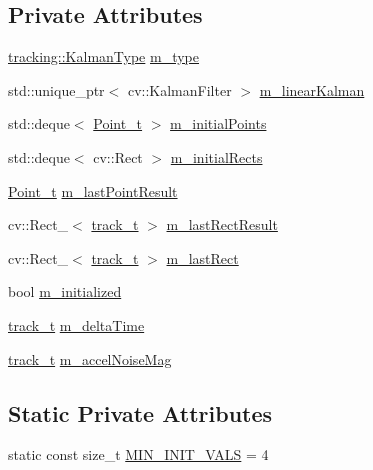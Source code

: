 \subsection*{Private Attributes}
\begin{DoxyCompactItemize}
\item 
\mbox{\hyperlink{namespacetracking_a83f2c4d58ea2737f7d6296dce3eb722a}{tracking\+::\+Kalman\+Type}} \mbox{\hyperlink{class_t_kalman_filter_a00cabc6683f6cc848559515df46d7101}{m\+\_\+type}}
\item 
std\+::unique\+\_\+ptr$<$ cv\+::\+Kalman\+Filter $>$ \mbox{\hyperlink{class_t_kalman_filter_aec607aacb57ef1f78e514c6b3ef18435}{m\+\_\+linear\+Kalman}}
\item 
std\+::deque$<$ \mbox{\hyperlink{defines_8h_a8c42696da8f098b91374a8e8bb84b430}{Point\+\_\+t}} $>$ \mbox{\hyperlink{class_t_kalman_filter_a5c4fc5a43ce0798dbe80f76f8aae2fc9}{m\+\_\+initial\+Points}}
\item 
std\+::deque$<$ cv\+::\+Rect $>$ \mbox{\hyperlink{class_t_kalman_filter_a76f15da72d3613b8ba41a9eb38faaeac}{m\+\_\+initial\+Rects}}
\item 
\mbox{\hyperlink{defines_8h_a8c42696da8f098b91374a8e8bb84b430}{Point\+\_\+t}} \mbox{\hyperlink{class_t_kalman_filter_a91efb6a00cfae5df3e513ceba2239fa3}{m\+\_\+last\+Point\+Result}}
\item 
cv\+::\+Rect\+\_\+$<$ \mbox{\hyperlink{defines_8h_a7ce9c8817b42ab418e61756f579549ab}{track\+\_\+t}} $>$ \mbox{\hyperlink{class_t_kalman_filter_aed4818c7aac455928ef02dd03f8bfe56}{m\+\_\+last\+Rect\+Result}}
\item 
cv\+::\+Rect\+\_\+$<$ \mbox{\hyperlink{defines_8h_a7ce9c8817b42ab418e61756f579549ab}{track\+\_\+t}} $>$ \mbox{\hyperlink{class_t_kalman_filter_a8e03a4e34d3f59c994a95ca0a5954a88}{m\+\_\+last\+Rect}}
\item 
bool \mbox{\hyperlink{class_t_kalman_filter_a5633e302e878261c8669816695f6a314}{m\+\_\+initialized}}
\item 
\mbox{\hyperlink{defines_8h_a7ce9c8817b42ab418e61756f579549ab}{track\+\_\+t}} \mbox{\hyperlink{class_t_kalman_filter_a7335e3bd7a695ebaf5eaa93c42e39eae}{m\+\_\+delta\+Time}}
\item 
\mbox{\hyperlink{defines_8h_a7ce9c8817b42ab418e61756f579549ab}{track\+\_\+t}} \mbox{\hyperlink{class_t_kalman_filter_a9f511e8885e5e89643fa6d59ea7bbd27}{m\+\_\+accel\+Noise\+Mag}}
\end{DoxyCompactItemize}
\subsection*{Static Private Attributes}
\begin{DoxyCompactItemize}
\item 
static const size\+\_\+t \mbox{\hyperlink{class_t_kalman_filter_a4511a3b64d2232e516b396e8783220cf}{M\+I\+N\+\_\+\+I\+N\+I\+T\+\_\+\+V\+A\+LS}} = 4
\end{DoxyCompactItemize}


